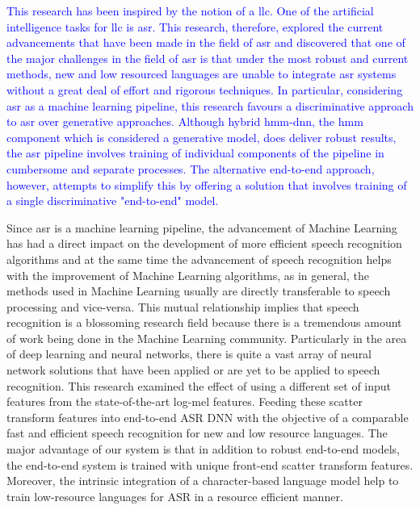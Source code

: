 \textcolor{blue}{This research has been inspired by the notion of a \acrfull{llc}. One of the artificial intelligence tasks for \acrshort{llc} is \acrfull{asr}.  This research, therefore, explored the current advancements that have been made in the field of \acrshort{asr} and discovered that one of the major challenges in the field of \acrshort{asr} is that under the most robust and current methods, new and low resourced languages are unable to integrate \acrshort{asr} systems without a great deal of effort and rigorous techniques.  In particular, considering \acrshort{asr} as a machine learning pipeline, this research favours a discriminative approach to \acrshort{asr} over generative approaches.  Although hybrid \acrshort{hmm}-\acrshort{dnn}, the hmm component which is considered a generative model, does deliver robust results, the \acrshort{asr} pipeline involves training of individual components of the pipeline in cumbersome and separate processes.  The alternative end-to-end approach, however, attempts to simplify this by offering a solution that involves training of a single discriminative "end-to-end" model. }

\startblue
Since \acrshort{asr} is a machine learning pipeline,  the advancement of Machine Learning has had a direct impact on the development of more efficient speech recognition algorithms and at the same time the advancement of speech recognition helps with the improvement of Machine Learning algorithms, as in general, the methods used in Machine Learning usually are directly transferable to speech processing and vice-versa. This mutual relationship implies that speech recognition is a blossoming research field because there is a tremendous amount of work being done in the Machine Learning community. Particularly in the area of deep learning and neural networks, there is quite a vast array of neural network solutions that have been applied or are yet to be applied to speech recognition. This research examined the effect of using a different set of input features from the state-of-the-art log-mel features. Feeding these scatter transform features into end-to-end ASR DNN with the objective of a comparable fast and efficient speech recognition for new and low resource languages. The major advantage of our system is that in addition to robust end-to-end models, the end-to-end system is trained with unique front-end scatter transform features. Moreover, the intrinsic integration of a character-based language model help to train low-resource languages for ASR in a resource efficient manner. 

